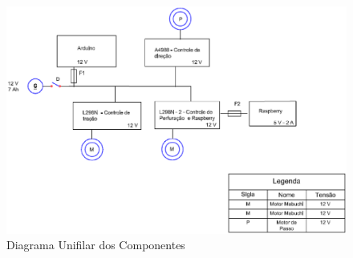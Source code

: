 \begin{itemize}
     \begin{figure}[!htbp]
     \begin{center}
     \includegraphics[keepaspectratio=true,scale=0.5]{figuras/unifilar.eps}
     \caption{\label{diagramaunifilar}Diagrama Unifilar dos Componentes}
     \end{center}
     \end{figure}

  \end{itemize}
